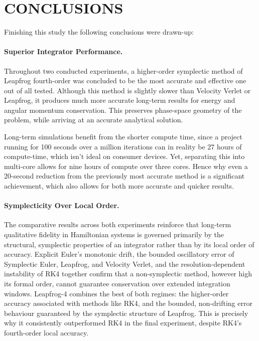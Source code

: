 \section{CONCLUSIONS}

Finishing this study the following conclusions were drawn-up:

\paragraph{Superior Integrator Performance.} Throughout two conducted experiments, a higher-order symplectic method
of Leapfrog fourth-order was concluded to be the most accurate and effective one out of all tested.
Although this method is slightly slower than Velocity Verlet or Leapfrog, it produces much more accurate long-term
results for energy and angular momentum conservation.
This preserves phase-space geometry of the problem, while arriving at an accurate analytical solution.

Long-term simulations benefit from the shorter compute time, since a project running for 100 seconds over a
million iterations can in reality be 27 hours of compute-time, which isn't ideal on consumer devices.
Yet, separating this into multi-core allows for nine hours of compute over three cores.
Hence why even a 20-second reduction from the previously most accurate method is a significant achievement,
which also allows for both more accurate and quicker results.

\paragraph{Symplecticity Over Local Order.} The comparative results across both experiments reinforce that
long-term qualitative fidelity in Hamiltonian systems is governed primarily by the structural, symplectic
properties of an integrator rather than by its local order of accuracy. Explicit Euler's monotonic drift,
the bounded oscillatory error of Symplectic Euler, Leapfrog, and Velocity Verlet, and the resolution-dependent
instability of RK4 together confirm that a non-symplectic method, however high its formal order, cannot
guarantee conservation over extended integration windows. Leapfrog-4 combines the best of both regimes:
the higher-order accuracy associated with methods like RK4, and the bounded, non-drifting error behaviour
guaranteed by the symplectic structure of Leapfrog. This is precisely why it consistently outperformed RK4
in the final experiment, despite RK4's fourth-order local accuracy.

